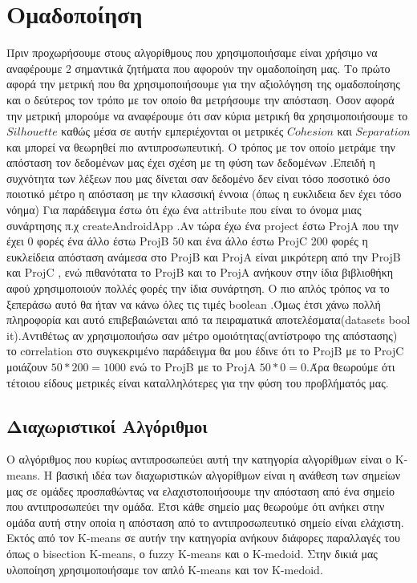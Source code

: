 \chapter{Ομαδοποίηση}
Πριν προχωρήσουμε στους αλγορίθμους που χρησιμοποιήσαμε είναι χρήσιμο να αναφέρουμε 2 σημαντικά ζητήματα που αφορούν την ομαδοποίηση μας. Το πρώτο αφορά την μετρική που θα χρησιμοποιήσουμε για την αξιολόγηση της ομαδοποίησης και ο δεύτερος τον τρόπο με τον οποίο θα μετρήσουμε την απόσταση. Όσον αφορά την μετρική μπορούμε να αναφέρουμε ότι σαν κύρια μετρική θα χρησιμοποιήσουμε το $Silhouette$ καθώς μέσα σε αυτήν εμπεριέχονται οι μετρικές $Cohesion$ και $Separation$ και μπορεί να θεωρηθεί πιο αντιπροσωπευτική.
Ο τρόπος με τον οποίο μετράμε την απόσταση τον δεδομένων μας έχει
σχέση με τη φύση των δεδομένων .Επειδή η συχνότητα των λέξεων που μας
δίνεται σαν δεδομένο δεν είναι τόσο ποσοτικό  όσο ποιοτικό μέτρο η απόσταση με την κλασσική έννοια (όπως η ευκλιδεια δεν έχει τόσο νόημα)
Για παράδειγμα έστω ότι έχω ένα attribute που είναι το όνομα μιας συνάρτησης π.χ createAndroidApp .Αν τώρα έχω  ένα project έστω ProjA  που την έχει 0 φορές ένα άλλο έστω ProjB 50 και ένα άλλο έστω ProjC 200 φορές 
η ευκλείδεια απόσταση ανάμεσα στο ProjB και ProjA είναι μικρότερη από την ProjB και ProjC , ενώ πιθανότατα το ProjB και το ProjA ανήκουν στην ίδια βιβλιοθήκη αφού χρησιμοποιούν πολλές φορές την ίδια συνάρτηση. Ο πιο απλός τρόπος να το ξεπεράσω αυτό θα ήταν να κάνω όλες τις τιμές boοlean .Όμως έτσι χάνω πολλή πληροφορία και αυτό επιβεβαιώνεται από τα πειραματικά αποτελέσματα(datasets bool it).Αντιθέτως αν χρησιμοποιήσω σαν μέτρο ομοιότητας(αντίστροφο της απόστασης) το cοrrelation στο συγκεκριμένο παράδειγμα θα μου έδινε  ότι το ProjB με το ProjC μοιάζουν $50*200=1000$
ενώ το ProjB με το ProjA $50*0=0$.Άρα θεωρούμε ότι τέτοιου είδους μετρικές είναι καταλληλότερες για την φύση του προβλήματός μας. 
\section{Διαχωριστικοί Αλγόριθμοι}
Ο αλγόριθμος που κυρίως αντιπροσωπεύει αυτή την κατηγορία αλγορίθμων είναι ο K-means. Η βασική ιδέα των διαχωριστικών αλγορίθμων είναι η ανάθεση των σημείων μας σε ομάδες προσπαθώντας να ελαχιστοποιήσουμε την απόσταση από ένα σημείο που αντιπροσωπεύει την ομάδα. Έτσι κάθε σημείο μας θεωρούμε ότι ανήκει στην ομάδα αυτή στην οποία η απόσταση από το αντιπροσωπευτικό σημείο είναι ελάχιστη. Εκτός από τον K-means σε αυτήν την κατηγορία ανήκουν διάφορες παραλλαγές του όπως ο bisection K-means, ο fuzzy Κ-means και ο K-medoid. Στην δικιά μας υλοποίηση χρησιμοποιήσαμε τον απλό K-means και τον K-medoid.

